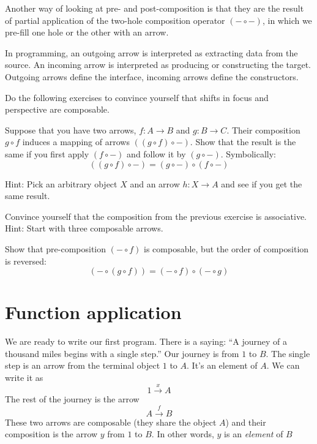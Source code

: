\documentclass[DaoFP]{subfiles}
\begin{document}
Another way of looking at pre- and post-composition is that they are the result of partial application of the two-hole composition operator $(- \circ -)$, in which we pre-fill one hole or the other with an arrow.

In programming, an outgoing arrow is interpreted as extracting data from the source. An incoming arrow is interpreted as producing or constructing the target. Outgoing arrows define the interface, incoming arrows define the constructors.

Do the following exercises to convince yourself that shifts in focus and perspective are composable.
\begin{exercise}\label{ex-yoneda-composition}
Suppose that you have two arrows, $f \colon A \to B$ and $g \colon B \to C$. Their composition $g \circ f$ induces a mapping of arrows $((g \circ f) \circ -)$. Show that the result is the same if you first apply $(f \circ -)$ and follow it by $(g \circ -)$. Symbolically:
\[((g \circ f) \circ -) = (g \circ -) \circ (f \circ -)\]

Hint: Pick an arbitrary object $X$ and an arrow $h \colon X \to A$ and see if you get the same result. 
\end{exercise}

\begin{exercise}
Convince yourself that the composition from the previous exercise is associative. Hint: Start with three composable arrows.
\end{exercise}

\begin{exercise}
Show that pre-composition $(- \circ f)$ is composable, but the order of composition is reversed:
\[(- \circ (g \circ f)) = (- \circ f) \circ (- \circ g) \]
\end{exercise}

\section{Function application}

We are ready to write our first program. There is a saying: ``A journey of a thousand miles begins with a single step.'' Our journey is from $1$ to $B$. The single step is an arrow from the terminal object $1$ to $A$. It's an element of $A$. We can write it as
\[1 \xrightarrow x A \]
The rest of the journey is the arrow 
\[A \xrightarrow f B\]
These two arrows are composable (they share the object $A$) and their composition is the arrow $y$ from $1$ to $B$. In other words, $y$ is an \emph{element} of $B$
\end{document}
